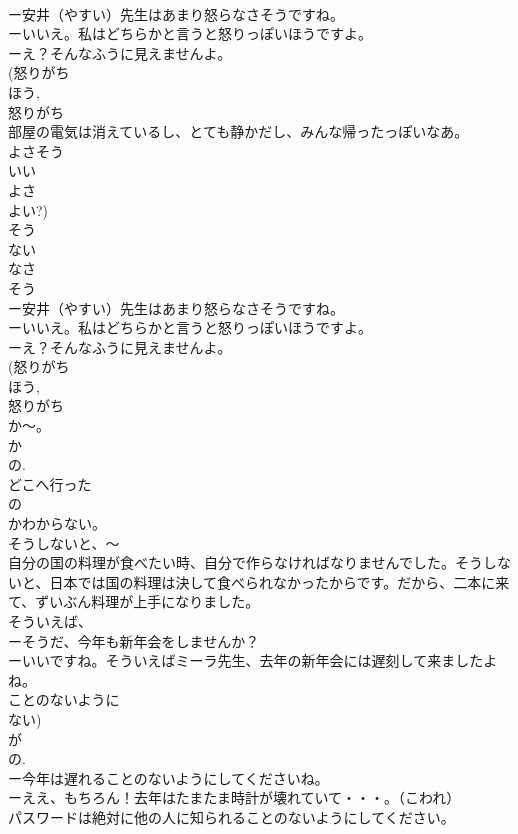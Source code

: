 \documentclass[8pt]{extreport}
\begin{document}
\begin{CJK}{UTF8}{min}
\\	ー安井（やすい）先生はあまり怒らなさそうですね。
\\	ーいいえ。私はどちらかと言うと怒りっぽいほうですよ。
\\	ーえ？そんなふうに見えませんよ。
\\	(怒りがち 
\\	ほう, 
\\	怒りがち 
\\	部屋の電気は消えているし、とても静かだし、みんな帰ったっぽいなあ。
\\	よさそう
\\	いい 
\\	よさ　
\\	よい?)
\\	そう
\\	ない 
\\	なさ
\\	そう
\\	ー安井（やすい）先生はあまり怒らなさそうですね。
\\	ーいいえ。私はどちらかと言うと怒りっぽいほうですよ。
\\	ーえ？そんなふうに見えませんよ。
\\	(怒りがち 
\\	ほう, 
\\	怒りがち 
\\	か～。
\\	か 
\\	の.
\\	どこへ行った
\\	の
\\	かわからない。
\\	そうしないと、～
\\	自分の国の料理が食べたい時、自分で作らなければなりませんでした。そうしないと、日本では国の料理は決して食べられなかったからです。だから、二本に来て、ずいぶん料理が上手になりました。	
\\	そういえば、
\\	ーそうだ、今年も新年会をしませんか？
\\	ーいいですね。そういえばミーラ先生、去年の新年会には遅刻して来ましたよね。
\\	ことのないように
\\	ない)
\\	が 
\\	の. 
\\	ー今年は遅れることのないようにしてくださいね。
\\	ーええ、もちろん！去年はたまたま時計が壊れていて・・・。（こわれ）
\\	パスワードは絶対に他の人に知られることのないようにしてください。

\end{CJK}
\end{document}
